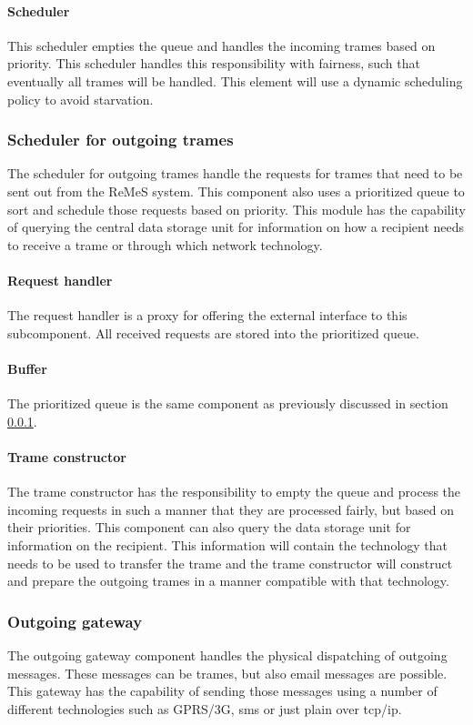 \paragraph{Scheduler} 
This scheduler empties the queue and handles the incoming trames based on priority. This scheduler handles this responsibility with fairness, such that eventually all trames will be handled. This element will use a dynamic scheduling policy to avoid starvation.
\subsubsection{Scheduler for outgoing trames}
\label{sec:SchedulerOutgoingTrames}
The scheduler for outgoing trames handle the requests for trames that need to be sent out from the ReMeS system.
This component also uses a prioritized queue to sort and schedule those requests based on priority.
This module has the capability of querying the central data storage unit for information on
how a recipient needs to receive a trame or through which network technology.
\paragraph{Request handler} 
The request handler is a proxy for offering the external interface to this subcomponent.
All received requests are stored into the prioritized queue.
\paragraph{Buffer}
The prioritized queue is the same component as previously discussed in section \ref{sec:SchedulerOutgoingTrames}.
\paragraph{Trame constructor}  
The trame constructor has the responsibility to empty the queue and process the incoming requests in such a manner that they are processed fairly, but based on their priorities.
This component can also query the data storage unit for information on the recipient. This information will contain the technology that needs to be used to transfer the trame and the trame constructor will construct and prepare the outgoing trames in a manner compatible with that technology.

\subsubsection{Outgoing gateway}
The outgoing gateway component handles the physical dispatching of outgoing messages. These messages can be trames, but also email messages are possible. This gateway has the capability of sending those messages using a number of different technologies such as GPRS/3G, sms or just plain over tcp/ip. 
